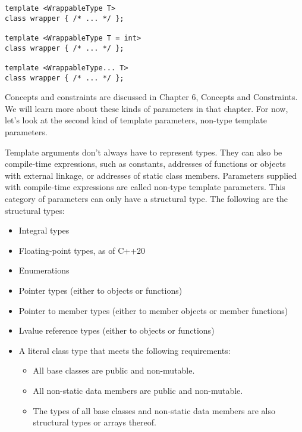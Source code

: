 \begin{lstlisting}[style=styleCXX]
template <WrappableType T>
class wrapper { /* ... */ };

template <WrappableType T = int>
class wrapper { /* ... */ };

template <WrappableType... T>
class wrapper { /* ... */ };
\end{lstlisting}

Concepts and constraints are discussed in Chapter 6, Concepts and Constraints. We will learn more about these kinds of parameters in that chapter. For now, let's look at the second kind of template parameters, non-type template parameters.



Template arguments don't always have to represent types. They can also be compile-time expressions, such as constants, addresses of functions or objects with external linkage, or addresses of static class members. Parameters supplied with compile-time expressions are called non-type template parameters. This category of parameters can only have a structural type. The following are the structural types:

\begin{itemize}
\item 
Integral types

\item 
Floating-point types, as of C++20

\item 
Enumerations

\item 
Pointer types (either to objects or functions)

\item 
Pointer to member types (either to member objects or member functions)

\item 
Lvalue reference types (either to objects or functions)

\item 
A literal class type that meets the following requirements:
\begin{itemize}
\item 
All base classes are public and non-mutable.

\item 
All non-static data members are public and non-mutable.

\item 
The types of all base classes and non-static data members are also structural types or arrays thereof.
\end{itemize}
\end{itemize}

